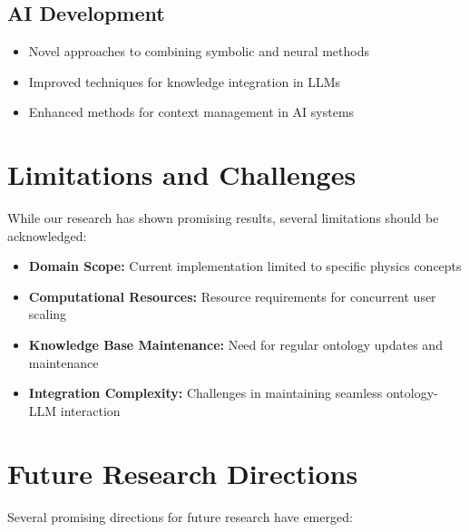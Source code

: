 \subsection{AI Development}
\begin{itemize}
    \item Novel approaches to combining symbolic and neural methods
    \item Improved techniques for knowledge integration in LLMs
    \item Enhanced methods for context management in AI systems
\end{itemize}

\section{Limitations and Challenges}
\label{sec:limitations}

While our research has shown promising results, several limitations should be acknowledged:

\begin{itemize}
    \item \textbf{Domain Scope:} Current implementation limited to specific physics concepts
    \item \textbf{Computational Resources:} Resource requirements for concurrent user scaling
    \item \textbf{Knowledge Base Maintenance:} Need for regular ontology updates and maintenance
    \item \textbf{Integration Complexity:} Challenges in maintaining seamless ontology-LLM interaction
\end{itemize}

\section{Future Research Directions}
\label{sec:future-work}

Several promising directions for future research have emerged:

